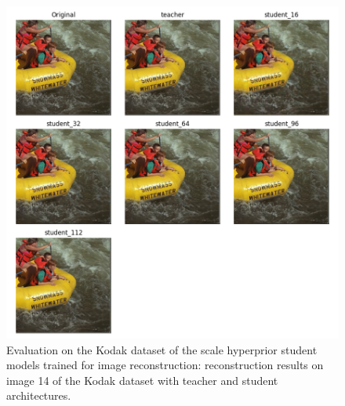 \begin{figure}
    \centering
    \includegraphics[width=15cm]{img/kd_ae_kodak_14.png}
    \caption[Evaluation on the Kodak dataset of the scale hyperprior student models trained for image reconstruction: reconstruction results on image 14 of the Kodak dataset with teacher and student architectures.]{Evaluation on the Kodak dataset of the scale hyperprior student models trained for image reconstruction: reconstruction results on image 14 of the Kodak dataset with teacher and student architectures.}
    \label{appendix:kd_ae_1:a}
\end{figure}


